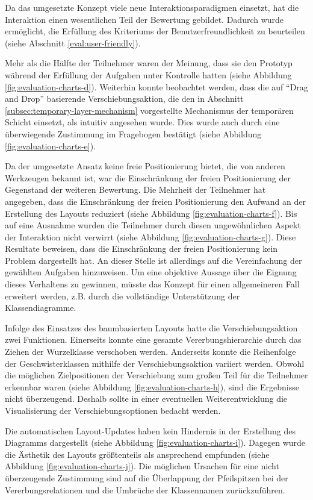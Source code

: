 Da das umgesetzte Konzept viele neue Interaktionsparadigmen einsetzt, hat die Interaktion einen wesentlichen Teil der Bewertung gebildet. Dadurch wurde ermöglicht, die Erfüllung des Kriteriums der Benutzerfreundlichkeit zu beurteilen (siehe Abschnitt \ref{eval:user-friendly}).

Mehr als die Hälfte der Teilnehmer waren der Meinung, dass sie den Prototyp während der Erfüllung der Aufgaben unter Kontrolle hatten (siehe Abbildung \ref{fig:evaluation-charts-d}). Weiterhin konnte beobachtet werden, dass die auf \enquote{Drag and Drop} basierende Verschiebungsaktion, die den in Abschnitt \ref{subsec:temporary-layer-mechanism} vorgestellte Mechanismus der temporären Schicht einsetzt, als intuitiv angesehen wurde. Dies wurde auch durch eine überwiegende Zustimmung im Fragebogen bestätigt (siehe Abbildung \ref{fig:evaluation-charts-e}).

Da der umgesetzte Ansatz keine freie Positionierung bietet, die von anderen Werkzeugen bekannt ist, war die Einschränkung der freien Positionierung der Gegenstand der weiteren Bewertung. Die Mehrheit der Teilnehmer hat angegeben, dass die Einschränkung der freien Positionierung den Aufwand an der Erstellung des Layouts reduziert (siehe Abbildung \ref{fig:evaluation-charts-f}). Bis auf eine Ausnahme wurden die Teilnehmer durch diesen ungewöhnlichen Aspekt der Interaktion nicht verwirrt (siehe Abbildung \ref{fig:evaluation-charts-g}). Diese Resultate beweisen, dass die Einschränkung der freien Positionierung kein Problem dargestellt hat. An dieser Stelle ist allerdings auf die Vereinfachung der gewählten Aufgaben hinzuweisen. Um eine objektive Aussage über die Eignung dieses Verhaltens zu gewinnen, müsste das Konzept für einen allgemeineren Fall erweitert werden, z.B. durch die vollständige Unterstützung der Klassendiagramme.

Infolge des Einsatzes des baumbasierten Layouts hatte die Verschiebungsaktion zwei Funktionen. Einerseits konnte eine gesamte Vererbungshierarchie durch das Ziehen der Wurzelklasse verschoben werden. Anderseits konnte die Reihenfolge der Geschwisterklassen mithilfe der Verschiebungsaktion variiert werden. Obwohl die möglichen Zielpositionen der Verschiebung zum großen Teil für die Teilnehmer erkennbar waren (siehe Abbildung \ref{fig:evaluation-charts-h}), sind die Ergebnisse nicht überzeugend. Deshalb sollte in einer eventuellen Weiterentwicklung die Visualisierung der Verschiebungsoptionen bedacht werden.

Die automatischen Layout-Updates haben kein Hindernis in der Erstellung des Diagramms dargestellt (siehe Abbildung \ref{fig:evaluation-charts-i}). Dagegen wurde die Ästhetik des Layouts größtenteils als ansprechend empfunden (siehe Abbildung \ref{fig:evaluation-charts-j}). Die möglichen Ursachen für eine nicht überzeugende Zustimmung sind auf die Überlappung der Pfeilspitzen bei der Vererbungsrelationen und die Umbrüche der Klassennamen zurückzuführen.

